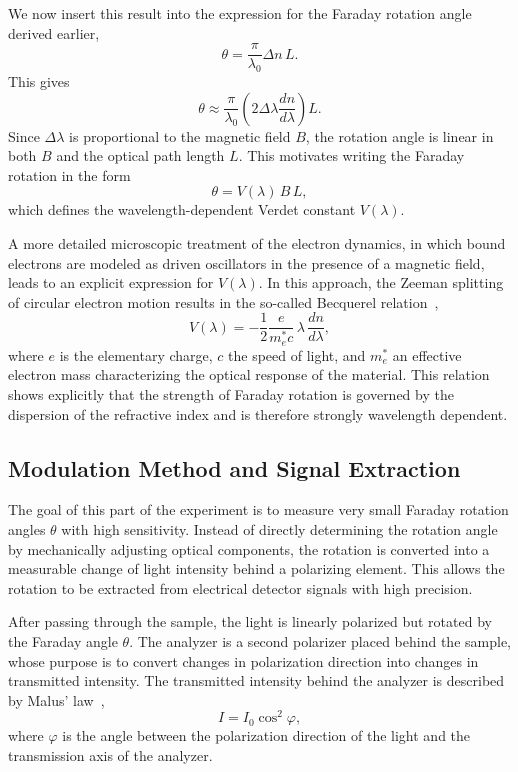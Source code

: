 \documentclass[a4paper]{article}
\begin{document}
We now insert this result into the expression for the Faraday rotation angle derived earlier,
\[
  \theta = \frac{\pi}{\lambda_0} \Delta n\, L.
\]
This gives
\[
  \theta \approx \frac{\pi}{\lambda_0} \left(2 \Delta\lambda \frac{dn}{d\lambda}\right) L.
\]
Since $\Delta\lambda$ is proportional to the magnetic field $B$, the rotation angle is linear in both $B$ and the optical path length $L$.
This motivates writing the Faraday rotation in the form
\begin{equation}
  \theta = V(\lambda)\, B\, L,
  \label{eq:faraday_verdet}
\end{equation}
which defines the wavelength-dependent Verdet constant $V(\lambda)$.

A more detailed microscopic treatment of the electron dynamics, in which bound electrons are modeled as driven oscillators in the presence of a magnetic field, leads to an explicit expression for $V(\lambda)$.
In this approach, the Zeeman splitting of circular electron motion results in the so-called Becquerel relation~\cite{FARAnleitung},
\begin{equation}
  V(\lambda) = -\frac{1}{2}\frac{e}{m_e^* c}\,\lambda\,\frac{dn}{d\lambda},
  \label{eq:becquerel}
\end{equation}
where $e$ is the elementary charge, $c$ the speed of light, and $m_e^*$ an effective electron mass characterizing the optical response of the material.
This relation shows explicitly that the strength of Faraday rotation is governed by the dispersion of the refractive index and is therefore strongly wavelength dependent.

\subsection{Modulation Method and Signal Extraction}

The goal of this part of the experiment is to measure very small Faraday rotation angles $\theta$ with high sensitivity.
Instead of directly determining the rotation angle by mechanically adjusting optical components, the rotation is converted into a measurable change of light intensity behind a polarizing element.
This allows the rotation to be extracted from electrical detector signals with high precision.

After passing through the sample, the light is linearly polarized but rotated by the Faraday angle $\theta$.
The analyzer is a second polarizer placed behind the sample, whose purpose is to convert changes in polarization direction into changes in transmitted intensity.
The transmitted intensity behind the analyzer is described by Malus' law~\cite{FARAnleitung},
\begin{equation}
  I = I_0 \cos^2 \varphi,
  \label{eq:malus_law}
\end{equation}
where $\varphi$ is the angle between the polarization direction of the light and the transmission axis of the analyzer.
\end{document}
